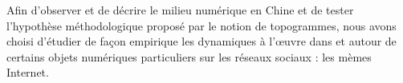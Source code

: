 Afin d’observer et de décrire le milieu numérique en Chine et de tester l’hypothèse méthodologique proposé par le notion de topogrammes, nous avons choisi d’étudier de façon empirique les dynamiques à l’œuvre dans et autour de certains objets numériques particuliers sur les réseaux sociaux : les mèmes Internet. 
